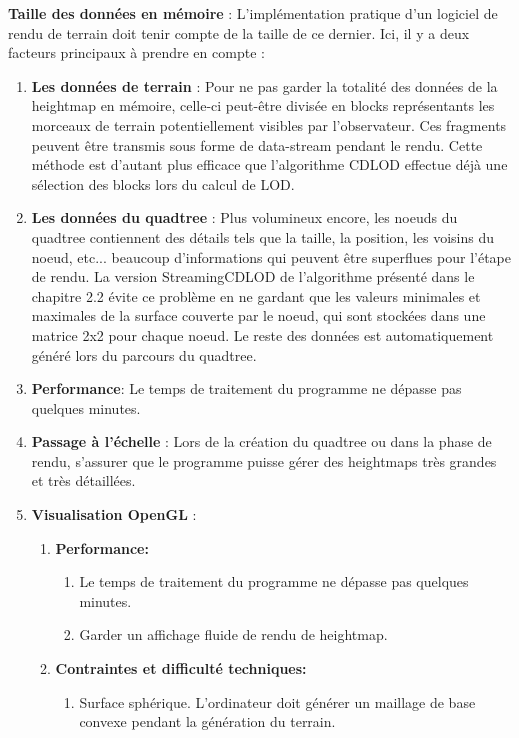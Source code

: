 \documentclass[12pt]{report}
\begin{document}
\textbf{Taille des données en mémoire} : L'implémentation pratique d'un logiciel de rendu de terrain doit tenir compte de la taille de ce dernier. Ici, il y a deux facteurs principaux à prendre en compte :
\begin{enumerate}
    \item \textbf{Les données de terrain} : Pour ne pas garder la totalité des données de la heightmap en mémoire, celle-ci peut-être divisée en blocks représentants les morceaux de terrain potentiellement visibles par l'observateur. Ces fragments peuvent être transmis sous forme de data-stream pendant le rendu. Cette méthode est d'autant plus efficace que l'algorithme CDLOD effectue déjà une sélection des blocks lors du calcul de LOD. 
    \item \textbf{Les données du quadtree} : Plus volumineux encore, les noeuds du quadtree contiennent des détails tels que la taille, la position, les voisins du noeud, etc... beaucoup d'informations qui peuvent être superflues pour l'étape de rendu. La version StreamingCDLOD de l'algorithme présenté dans le chapitre 2.2 évite ce problème en ne gardant que les valeurs minimales et maximales de la surface couverte par le noeud, qui sont stockées dans une matrice 2x2 pour chaque noeud. Le reste des données est automatiquement généré lors du parcours du quadtree.
    \item \textbf{Performance}: Le temps de traitement du programme ne dépasse pas quelques minutes.
    \item \textbf{Passage à l'échelle} : Lors de la création du quadtree ou dans la phase de rendu, s'assurer que le programme puisse gérer des heightmaps très grandes et très détaillées.
    \item \textbf{Visualisation OpenGL} :
    \begin{enumerate}
        \item \textbf{Performance:}
        \begin{enumerate}
            \item Le temps de traitement du programme ne dépasse pas quelques minutes.
            \item Garder un affichage fluide de rendu de heightmap.
        \end{enumerate}
            \item \textbf{Contraintes et difficulté techniques:}
            \begin{enumerate}
                \item Surface sphérique. L'ordinateur doit générer un maillage de base convexe pendant la génération du terrain.

\end{enumerate}
\end{enumerate}
\end{enumerate}
\end{document}
